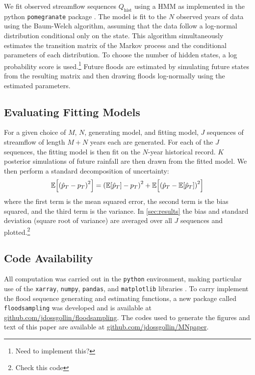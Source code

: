 \documentclass[12pt]{article}
\begin{document}
We fit observed streamflow sequences \(Q_\text{hist}\) using a HMM as implemented in the python \texttt{pomegranate} package \citep{Schreiber2016}.
The model is fit to the \(N\) observed years of data using the Baum-Welch algorithm, assuming that the data follow a log-normal distribution conditional only on the state.
This algorithm simultaneously estimates the transition matrix of the Markov process and the conditional parameters of each distribution.
To choose the number of hidden states, a log probability score is used.\footnote{Need to implement this?}
Future floods are estimated by simulating future states from the resulting matrix and then drawing floods log-normally using the estimated parameters.

\subsection{Evaluating Fitting Models}

For a given choice of \(M\), \(N\), generating model, and fitting model, \(J\) sequences of streamflow of length \(M+N\) years each are generated.
For each of the \(J\) sequences, the fitting model is then fit on the \(N\)-year historical record.
\(K\) posterior simulations of future rainfall are then drawn from the fitted model.
We then perform a standard decomposition of uncertainty:
\begin{equation}
  \mathbb{E} \qty[ \qty( \hat{p}_T - p_T )^2 ] = \qty( \mathbb{E} \qty[ \hat{p}_T ] - p_T )^2 + \mathbb{E} \qty[ \qty( \hat{p}_T - \mathbb{E} \qty[ \hat{p}_T ] )^2]
\end{equation}
where the first term is the mean squared error, the second term is the bias squared, and the third term is the variance.
In \cref{sec:results} the bias and standard deviation (square root of variance) are averaged over all \(J\) sequences and plotted.\footnote{Check this code}

\subsection{Code Availability}

All computation was carried out in the \texttt{python} environment, making particular use of the \texttt{xarray}, \texttt{numpy}, \texttt{pandas}, and \texttt{matplotlib} libraries \citep{Hoyer2017,vanderWalt2011,McKinney2010,Hunter2007}.
To carry implement the flood sequence generating and estimating functions, a new package called \texttt{floodsampling} was developed and is available at \url{github.com/jdossgollin/floodsampling}.
The codes used to generate the figures and text of this paper are available at \url{github.com/jdossgollin/MNpaper}.
\end{document}
